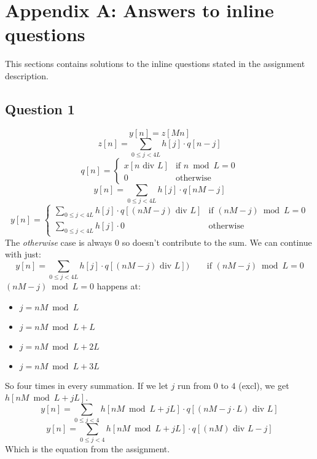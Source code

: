 \section{Appendix A: Answers to inline questions}
This sections contains solutions to the inline questions stated in the assignment description.
\subsection{Question 1}
\begin{equation*}
y[n] = z[Mn]
\end{equation*}
\begin{equation*}
z[n] = \sum_{0\leq j < 4L} h[j] \cdot q[n-j]
\end{equation*}
\begin{equation*}
q[n] = \begin{cases}
x[n \text{ div } L]&\text{if } n \bmod L = 0\\
0&\text{otherwise}
\end{cases}
\end{equation*}
\begin{equation*}
y[n] = \sum_{0\leq j<4L} h[j] \cdot q[nM-j]
\end{equation*}
\begin{equation*}
y[n] = \begin{cases}
\sum_{0 \leq j < 4L} h[j] \cdot q[(nM-j) \text{ div } L]&\text{if } (nM - j) \bmod L = 0\\
\sum_{0 \leq j < 4L} h[j] \cdot 0 &\text{otherwise}
\end{cases}
\end{equation*}
The \emph{otherwise} case is always 0 so doesn't contribute to the sum.
We can continue with just:
\begin{equation*}
y[n] = \sum_{0\leq j<4L} h[j] \cdot q[(nM-j) \text{ div } L])  \phantom{xxx}\text{ if } (nM-j) \bmod L = 0
\end{equation*}
$(nM-j) \bmod L = 0$  happens at:
\begin{itemize}
\item $  j = nM \bmod L$
\item $  j = nM \bmod L + L$
\item $  j = nM \bmod L + 2L$
\item $  j = nM \bmod L + 3L$
\end{itemize}
So four times in every summation. If we let $j$ run from $0$ to $4$ (excl),
we get $h[nM \bmod L + jL]$.
\begin{equation*}
y[n] = \sum_{0\leq j<4} h[nM \bmod L + jL] \cdot q[(nM-j \cdot L) \text{ div } L]
\end{equation*}
\begin{equation*}
y[n] = \sum_{0\leq j<4} h[nM \bmod L + jL] \cdot q[(nM) \text{ div } L - j]
\end{equation*}
Which is the equation from the assignment. 

